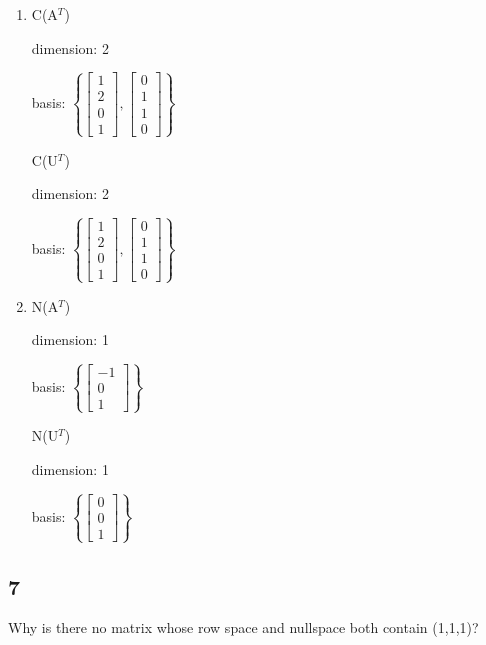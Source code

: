 \documentclass[12pt,letterpaper]{article}
\begin{document}
\begin{enumerate}
        \item
          C(A$^T$)

          dimension: 2

          basis:
          $\left\{\begin{bmatrix}1 \\ 2 \\ 0 \\ 1\end{bmatrix}, \begin{bmatrix}0 \\ 1 \\ 1 \\ 0\end{bmatrix}\right\}$

          C(U$^T$)

          dimension: 2

          basis:
          $\left\{\begin{bmatrix}1 \\ 2 \\ 0 \\ 1\end{bmatrix}, \begin{bmatrix}0 \\ 1 \\ 1 \\ 0\end{bmatrix}\right\}$

        \item
          N(A$^T$)

          dimension: 1

          basis:
          $\left\{\begin{bmatrix}-1 \\ 0 \\ 1\end{bmatrix}\right\}$

          N(U$^T$)

          dimension: 1

          basis:
          $\left\{\begin{bmatrix}0 \\ 0 \\ 1\end{bmatrix}\right\}$
      \end{enumerate}
    \subsection*{7}
      Why is there no matrix whose row space and nullspace both contain (1,1,1)?
\end{document}
